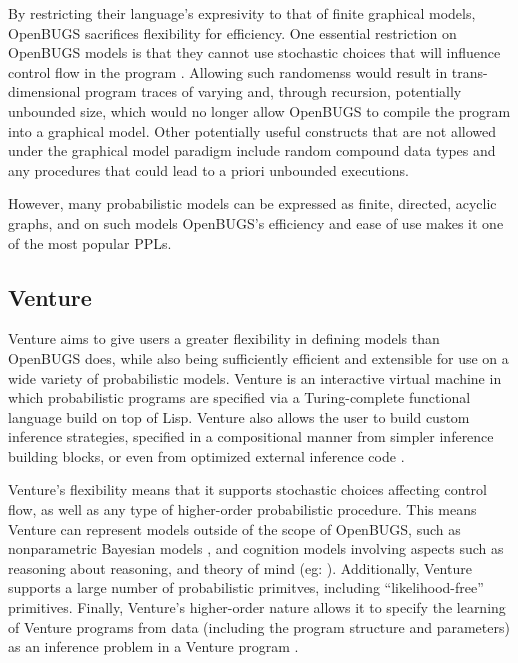 By restricting their language's expresivity to that of finite graphical models, OpenBUGS sacrifices flexibility for efficiency. One essential restriction on OpenBUGS models is that they cannot use stochastic choices that will influence control flow in the program \cite{lunn2009bugs}. Allowing such randomenss would result in trans-dimensional program traces of varying and, through recursion, potentially unbounded size, which would no longer allow OpenBUGS to compile the program into a graphical model. Other potentially useful constructs that are not allowed under the graphical model paradigm include random compound data types and any procedures that could lead to a priori unbounded executions.

However, many probabilistic models can be expressed as finite, directed, acyclic graphs, and on such models OpenBUGS's efficiency and ease of use makes it one of the most popular PPLs.

\subsection{Venture}

Venture aims to give users a greater flexibility in defining models than OpenBUGS does, while also being sufficiently efficient and extensible for use on a wide variety of probabilistic models. Venture is an interactive virtual machine in which probabilistic programs are specified via a Turing-complete functional language build on top of Lisp. Venture also allows the user to build custom inference strategies, specified in a compositional manner from simpler inference building blocks, or even from optimized external inference code \cite{mansinghka2014venture}. 

Venture's flexibility means that it supports stochastic choices affecting control flow, as well as any type of higher-order probabilistic procedure. This means Venture can represent models outside of the scope of OpenBUGS, such as nonparametric Bayesian models \cite{roy2008stochastic}, and cognition models involving aspects such as reasoning about reasoning, and theory of mind (eg: \cite{probMods, gerstenberg2012ping}). Additionally, Venture supports a large number of probabilistic primitves, including ``likelihood-free'' primitives. Finally, Venture's higher-order nature allows it to specify the learning of Venture programs from data (including the program structure and parameters) as an inference problem in a Venture program \cite{mansinghka2009natively}.

